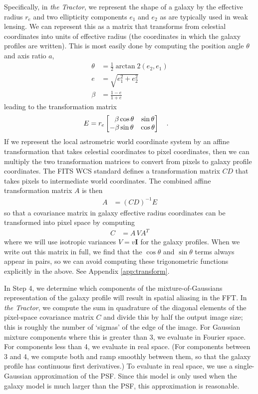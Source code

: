 \documentclass[11pt,preprint]{aastex}
\newcommand{\appref}[1]{Appendix \ref{#1}}
\newcommand{\project}[1]{\textsl{#1}}
\newcommand{\transpose}[1]{#1^{T}}
\newcommand{\CD}{C\!D}
\begin{document}
Specifically, in \project{the Tractor}, we represent the shape of a
galaxy by the effective radius $r_e$ and two ellipticity components
$e_1$ and $e_2$ as are typically used in weak lensing.  We can
represent this as a matrix that transforms from celestial coordinates
into units of effective radius (the coordinates in which the galaxy
profiles are written).  This is most easily done by computing the
position angle $\theta$ and axis ratio $a$,
\begin{align}
%
\theta & = \frac{1}{2} \arctan\!2(e_2, e_1) \\
%
e & = \sqrt{e_1^2 + e_2^2} \\
%
\beta & = \frac{1 - e}{1 + e} \label{eq:a}
\end{align}
leading to the transformation matrix
\begin{align}
E &= r_e \begin{bmatrix}
\textcolor{white}{-}\beta \cos{\theta} & \sin{\theta} \\
-\beta \sin{\theta} & \cos{\theta} \\
\end{bmatrix} \quad .
\end{align}
If we represent the local astrometric world coordinate system by an
affine transformation that takes celestial coordinates to pixel
coordinates, then we can multiply the two transformation matrices to
convert from pixels to galaxy profile coordinates.  The FITS WCS
standard \citep{wcs2} defines a transformation matrix $\CD$ that takes
pixels to intermediate world coordinates.  The combined affine transformation
matrix $A$ is then
\begin{align}
A & = (\CD)^{-1} E
\end{align}
so that a covariance matrix in galaxy effective radius coordinates can
be transformed into pixel space by computing
\begin{align}
C &= A \, V \transpose{A}
\label{eq:vpix}
\end{align}
where we will use isotropic variances $V = v \bm{I}$ for the galaxy profiles.
When we write out this matrix in full, we find that the $\cos{\theta}$
and $\sin{\theta}$ terms always appear in pairs, so we can avoid
computing these trigonometric functions explicitly in the above.  See
\appref{app:transform}.


In Step 4, we determine which components of the mixture-of-Gaussians
representation of the galaxy profile will result in spatial aliasing
in the FFT.  In \project{the Tractor}, we compute the sum in
quadrature of the diagonal elements of the pixel-space covariance
matrix $C$ and divide this by half the output image size; this is
roughly the number of `sigmas' of the edge of the image.  For Gaussian
mixture components where this is greater than 3, we evaluate in
Fourier space.  For components less than 4, we evaluate in real space.
(For components between 3 and 4, we compute both and ramp smoothly
between them, so that the galaxy profile has continuous first
derivatives.)  To evaluate in real space, we use a single-Gaussian
approximation of the PSF.  Since this model is only used when the
galaxy model is much larger than the PSF, this approximation is
reasonable.
\end{document}
